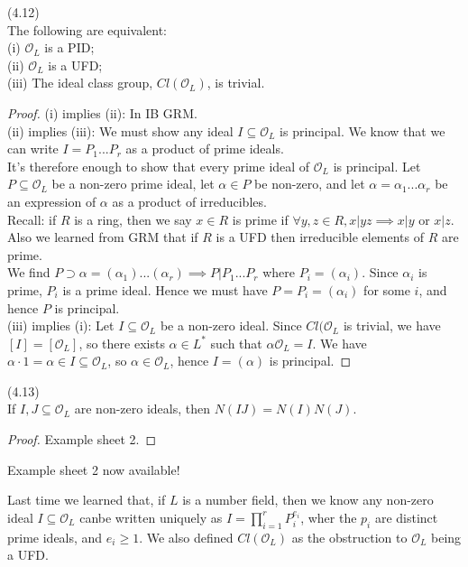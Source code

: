 \documentclass[a4paper]{article}
\begin{document}
\begin{prop} (4.12)\\
The following are equivalent:\\
(i) $\mathcal{O}_L$ is a PID;\\
(ii) $\mathcal{O}_L$ is a UFD;\\
(iii) The ideal class group, $Cl(\mathcal{O}_L)$, is trivial.
\begin{proof}
(i) implies (ii): In IB GRM.\\
(ii) implies (iii): We must show any ideal $I \subseteq \mathcal{O}_L$ is principal. We know that we can write $I=P_1...P_r$ as a product of prime ideals.\\
It's therefore enough to show that every prime ideal of $\mathcal{O}_L$ is principal. Let $P \subseteq \mathcal{O}_L$ be a non-zero prime ideal, let $\alpha \in P$ be non-zero, and let $\alpha=\alpha_1...\alpha_r$ be an expression of $\alpha$ as a product of irreducibles.\\
Recall: if $R$ is a ring, then we say $x \in R$ is prime if $\forall y,z \in R, x|yz \implies x|y$ or $x|z$. Also we learned from GRM that if $R$ is a UFD then irreducible elements of $R$ are prime.\\
We find $P \supset \alpha = (\alpha_1)...(\alpha_r) \implies P | P_1...P_r$ where $P_i = (\alpha_i)$. Since $\alpha_i$ is prime, $P_i$ is a prime ideal. Hence we must have $P=P_i = (\alpha_i)$ for some $i$, and hence $P$ is principal.\\
(iii) implies (i): Let $I \subseteq \mathcal{O}_L$ be a non-zero ideal. Since $Cl(\mathcal{O}_L$ is trivial, we have $[I] = [\mathcal{O}_L]$, so there exists $\alpha \in L^*$ such that $\alpha \mathcal{O}_L = I$. We have $\alpha \cdot 1 = \alpha \in I \subseteq \mathcal{O}_L$, so $\alpha \in \mathcal{O}_L$, hence $I=(\alpha)$ is principal.
\end{proof}
\end{prop}

\begin{lemma} (4.13)\\
If $I,J \subseteq \mathcal{O}_L$ are non-zero ideals, then $N(IJ) = N(I)N(J)$.
\begin{proof}
Example sheet 2.
\end{proof}
\end{lemma}

Example sheet 2 now available!

Last time we learned that, if $L$ is a number field, then we know any non-zero ideal $I \subseteq \mathcal{O}_L$ canbe written uniquely as $I = \prod_{i=1}^r P_i^{e_i}$, wher the $p_i$ are distinct prime ideals, and $e_i \geq 1$. We also defined $Cl(\mathcal{O}_L)$ as the obstruction to $\mathcal{O}_L$ being a UFD.
\end{document}

